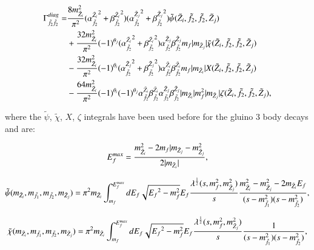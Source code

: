\documentclass[final,3p,times,pdflatex]{elsarticle}
\begin{document}
\begin{equation}
\begin{aligned}
\Gamma_{\tilde{f}_2 \tilde{f}_2}^{diag} = & {8m_{\tilde{Z}_i}^2 \over \pi^2}({\alpha_{\tilde{f}_2}^{\tilde{Z}_i}}^2 + {\beta_{\tilde{f}_2}^{\tilde{Z}_i}}^2) ({\alpha_{\tilde{f}_2}^{\tilde{Z}_j}}^2 + {\beta_{\tilde{f}_2}^{\tilde{Z}_j}}^2)  \tilde{\psi}(\tilde{Z}_i,\tilde{f}_2,\tilde{f}_2,\tilde{Z}_j) \\ & + {32 m_{\tilde{Z}_i}^2 \over \pi^2}(-1)^{\theta_j} ({\alpha_{\tilde{f}_2}^{\tilde{Z}_i}}^2 + {\beta_{\tilde{f}_2}^{\tilde{Z}_i}}^2) {\alpha_{\tilde{f}_2}^{\tilde{Z}_j}} {\beta_{\tilde{f}_2}^{\tilde{Z}_j}} m_{f} |m_{\tilde{Z}_j}|\tilde{\chi}(\tilde{Z}_i,\tilde{f}_2, \tilde{f}_2, \tilde{Z}_j) \\ & - {32 m_{\tilde{Z}_i}^2 \over \pi^2}(-1)^{\theta_i} ({\alpha_{\tilde{f}_2}^{\tilde{Z}_j}}^2 + {\beta_{\tilde{f}_2}^{\tilde{Z}_j}}^2) {\alpha_{\tilde{f}_2}^{\tilde{Z}_i}} {\beta_{\tilde{f}_2}^{\tilde{Z}_i}} m_f |m_{\tilde{Z}_i}|X(\tilde{Z}_i, \tilde{f}_2, \tilde{f}_2, \tilde{Z}_j) \\ & - {64 m_{\tilde{Z}_i}^2 \over \pi^2}(-1)^{\theta_i}(-1)^{\theta_j} {\alpha_{\tilde{f}_2}^{\tilde{Z}_i}} {\beta_{\tilde{f}_2}^{\tilde{Z}_i}} {\alpha_{\tilde{f}_2}^{\tilde{Z}_j}} {\beta_{\tilde{f}_2}^{\tilde{Z}_j}} |m_{\tilde{Z}_i}|m_{f}^2 |m_{\tilde{Z}_j}| \zeta(\tilde{Z}_i,\tilde{f}_2, \tilde{f}_2, \tilde{Z}_j),
\end{aligned}
\end{equation}

where the $\tilde{\psi}$, $\tilde{\chi}$, $X$, $\zeta$ integrals have been used before for the gluino 3 body decays and are:

\begin{equation}
E^{max}_{f} = {m_{\tilde{Z}_i}^2 - 2m_{f}|m_{\tilde{Z}_j} - m_{\tilde{Z}_j}^2 \over 2|m_{\tilde{Z}_i}|},
\end{equation}


\begin{equation} \label{psiintegral}
\tilde{\psi} (m_{\tilde{Z}_i},m_{\tilde{f}_1},m_{\tilde{f}_2},m_{\tilde{Z}_j}) = \pi^2 m_{\tilde{Z}_i} \int_{m_{f}}^{E^{max}_{f}} dE_f \sqrt{{E_f}^2 - m_{f}^2} E_f {\lambda^{1 \over 2} (s,m_{f}^2, m_{\tilde{Z}_j}^2) \over s} {m_{\tilde{Z}_i}^2 - m_{\tilde{Z}_j}^2 - 2m_{\tilde{Z}_i}E_f \over (s-m_{\tilde{f}_1}^2)(s-m_{\tilde{f}_2}^2)},
\end{equation} 


\begin{equation} \label{chitildaintegral}
\tilde{\chi} (m_{\tilde{Z}_i},m_{\tilde{f}_1},m_{\tilde{f}_2},m_{\tilde{Z}_j}) = \pi^2 m_{\tilde{Z}_i} \int_{m_{f}}^{E^{max}_{f}} dE_f \sqrt{{E_f}^2 - m_{f}^2} E_f {\lambda^{1 \over 2} (s,m_{f}^2, m_{\tilde{Z}_j}^2) \over s} {1 \over (s-m_{\tilde{f}_1}^2)(s-m_{\tilde{f}_2}^2)},
\end{equation}
\end{document}
